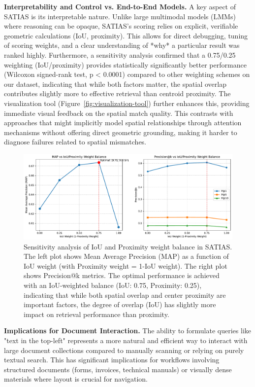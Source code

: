 \documentclass[manuscript,screen]{acmart}
\begin{document}
\textbf{Interpretability and Control vs. End-to-End Models.} A key aspect of SATIAS is its interpretable nature. Unlike large multimodal models (LMMs) \cite{Huang24, Yin24} where reasoning can be opaque, SATIAS's scoring relies on explicit, verifiable geometric calculations (IoU, proximity). This allows for direct debugging, tuning of scoring weights, and a clear understanding of *why* a particular result was ranked highly. Furthermore, a sensitivity analysis confirmed that a 0.75/0.25 weighting (IoU/proximity) provides statistically significantly better performance (Wilcoxon signed-rank test, p < 0.0001) compared to other weighting schemes on our dataset, indicating that while both factors matter, the spatial overlap contributes slightly more to effective retrieval than centroid proximity. The visualization tool (Figure~\ref{fig:visualization-tool}) further enhances this, providing immediate visual feedback on the spatial match quality. This contrasts with approaches that might implicitly model spatial relationships through attention mechanisms without offering direct geometric grounding, making it harder to diagnose failures related to spatial mismatches.

\begin{figure}[htbp]
    \centering
    \includegraphics[width=\textwidth]{figures/sensitivity_analysis.pdf}
    \caption{Sensitivity analysis of IoU and Proximity weight balance in SATIAS. The left plot shows Mean Average Precision (MAP) as a function of IoU weight (with Proximity weight = 1-IoU weight). The right plot shows Precision@k metrics. The optimal performance is achieved with an IoU-weighted balance (IoU: 0.75, Proximity: 0.25), indicating that while both spatial overlap and center proximity are important factors, the degree of overlap (IoU) has slightly more impact on retrieval performance than proximity.}
    \label{fig:sensitivity}
\end{figure}

\textbf{Implications for Document Interaction.} The ability to formulate queries like "text in the top-left" represents a more natural and efficient way to interact with large document collections compared to manually scanning or relying on purely textual search. This has significant implications for workflows involving structured documents (forms, invoices, technical manuals) or visually dense materials where layout is crucial for navigation.
\end{document}
